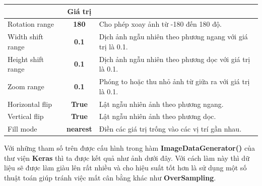 \documentclass[12pt,a4paper]{article}
\begin{document}
	\begin{center}
		\begin{tabular}{|l|c|l|}
			\hline
			\rowcolor[HTML]{000000} 
			\multicolumn{1}{|c|}{\cellcolor[HTML]{000000}{\color[HTML]{FFFFFF} \textbf{Tham số}}} & {\color[HTML]{FFFFFF} \textbf{Giá trị}} & \multicolumn{1}{c|}{\cellcolor[HTML]{000000}{\color[HTML]{FFFFFF} \textbf{Mô tả}}} \\ \hline
			Rotation range                                                                        & \textbf{180}                            & Cho phép xoay ảnh từ -180 đến 180 độ.                                              \\ \hline
			Width shift range                                                                     & \textbf{0.1}                            & Dịch ảnh ngẫu nhiên theo phương ngang với giá trị là 0.1.                          \\ \hline
			Height shift range                                                                    & \textbf{0.1}                            & Dịch ảnh ngẫu nhiên theo phương dọc với giá trị là 0.1.                            \\ \hline
			Zoom range                                                                            & \textbf{0.1}                            & Phóng to hoặc thu nhỏ ảnh từ giữa ra với giá trị là 0.1.                           \\ \hline
			Horizontal flip                                                                       & \textbf{True}                           & Lật ngẫu nhiên ảnh theo phương ngang.                                              \\ \hline
			Vertical flip                                                                         & \textbf{True}                           & Lật ngẫu nhiên ảnh theo phương dọc.                                                \\ \hline
			Fill mode                                                                             & \textbf{nearest}                        & Điền các giá trị trống vào các vị trí gần nhau.                                    \\ \hline
		\end{tabular}
	\end{center}
	\noindent
	Với những tham số trên được cấu hình trong hàm \textbf{ImageDataGenerator()} của thư viện \textbf{Keras} thì ta được kết quả như ảnh dưới đây. Với cách làm này thì dữ liệu sẽ được làm giàu lên rất nhiều và cho hiệu suất tốt hơn là sử dụng một số thuật toán giúp tránh việc mất cân bằng khác như \textbf{OverSampling}.
\end{document}
